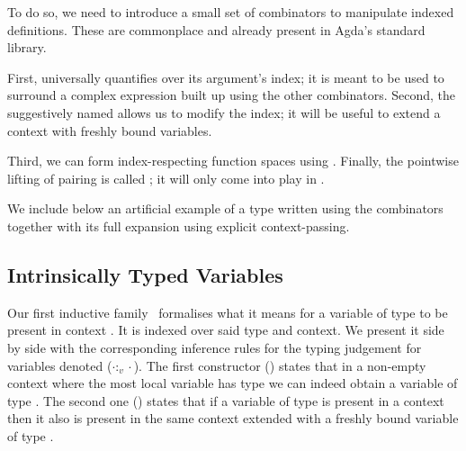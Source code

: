 \documentclass{article}
\begin{document}
To do so, we need to introduce a small set of combinators
to manipulate indexed definitions. These are commonplace
and already present in Agda's standard library.

\noindent
\begin{minipage}{.4\textwidth}
\end{minipage}\hfill
\begin{minipage}{.5\textwidth}
\end{minipage}

First,  universally quantifies over its argument's index;
it is meant to be used to surround a complex expression built
up using the other combinators.
%
Second, the suggestively named  allows us to modify
the index; it will be useful to extend a context with freshly
bound variables.

\noindent
\begin{minipage}{.4\textwidth}
\end{minipage}\hfill
\begin{minipage}{.5\textwidth}
\end{minipage}

Third, we can form index-respecting function spaces using .
%
Finally, the pointwise lifting of pairing is called ;
it will only come into play in .

We include below an artificial example of a type written using
the combinators together with its full expansion using explicit
context-passing.

\begin{AgdaSuppressSpace}
\end{AgdaSuppressSpace}

\subsection{Intrinsically Typed Variables}

Our first inductive family~\cite{DBLP:journals/fac/Dybjer94} formalises
what it means for a variable of type  to be present in context .
It is indexed over said type and context.
We present it side by side
with the corresponding inference rules for the typing judgement
for variables denoted ($\cdot :_v \cdot$).
%
The first constructor () states that in a non-empty context
where the most local variable has type  we can indeed obtain a
variable of type .
%
The second one () states that if a variable of type 
is present in a context then it also is present in the same context
extended with a freshly bound variable of type .
\end{document}
